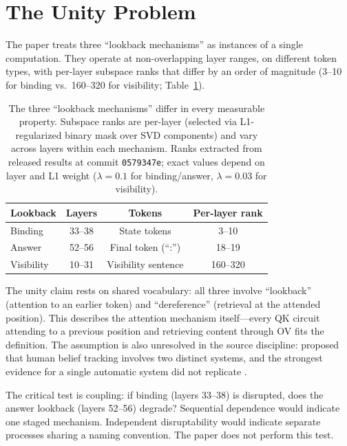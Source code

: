 \documentclass{article}
\begin{document}
\section{The Unity Problem}
\label{sec:unity}

The paper treats three ``lookback mechanisms'' as instances of a single computation. They operate at non-overlapping layer ranges, on different token types, with per-layer subspace ranks that differ by an order of magnitude (3--10 for binding vs.\ 160--320 for visibility; Table~\ref{tab:unity}).

\begin{table}[t]
\centering
\caption{The three ``lookback mechanisms'' differ in every measurable property. Subspace ranks are per-layer (selected via L1-regularized binary mask over SVD components) and vary across layers within each mechanism. Ranks extracted from released results at commit \texttt{0579347e}; exact values depend on layer and L1 weight ($\lambda = 0.1$ for binding/answer, $\lambda = 0.03$ for visibility).}
\label{tab:unity}
\begin{tabular}{lccc}
\toprule
Lookback & Layers & Tokens & Per-layer rank \\
\midrule
Binding & 33--38 & State tokens & 3--10 \\
Answer & 52--56 & Final token (``:'') & 18--19 \\
Visibility & 10--31 & Visibility sentence & 160--320 \\
\bottomrule
\end{tabular}
\end{table}

The unity claim rests on shared vocabulary: all three involve ``lookback'' (attention to an earlier token) and ``dereference'' (retrieval at the attended position). This describes the attention mechanism itself---every QK circuit attending to a previous position and retrieving content through OV fits the definition. The assumption is also unresolved in the source discipline: \citet{apperly2009humans} proposed that human belief tracking involves two distinct systems, and the strongest evidence for a single automatic system \citep{kovacs2010social} did not replicate \citep{phillips2015second}.

The critical test is coupling: if binding (layers 33--38) is disrupted, does the answer lookback (layers 52--56) degrade? Sequential dependence would indicate one staged mechanism. Independent disruptability would indicate separate processes sharing a naming convention. The paper does not perform this test.
\end{document}
